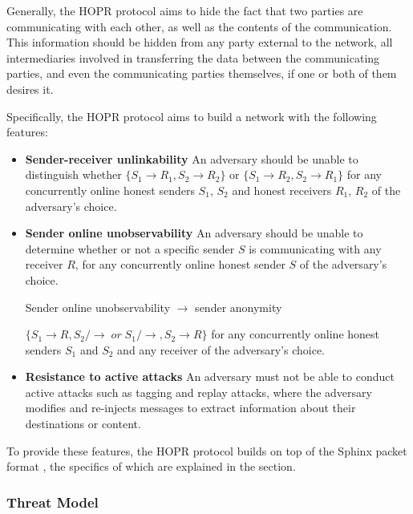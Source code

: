 Generally, the HOPR protocol aims to hide the fact that two parties are communicating with each other, as well as the contents of the communication. This information should be hidden from any party external to the network, all intermediaries involved in transferring the data between the communicating parties, and even the communicating parties themselves, if one or both of them desires it.

Specifically, the HOPR protocol aims to build a network with the following features:

\begin{itemize}

    \item \textbf{Sender-receiver unlinkability} An adversary should be unable
        to distinguish whether $\{S_1\rightarrow R_1, S_2\rightarrow R_2\}$ or
        $\{S_1\rightarrow R_2, S_2\rightarrow R_1\}$ for any concurrently online
        honest senders $S_1$, $S_2$ and honest receivers $R_1$, $R_2$ of the
        adversary’s choice.
      \item \textbf{Sender online unobservability} An adversary should be unable to determine whether or not a specific sender $S$ is communicating with any receiver $R$, for any concurrently online honest sender $S$ of the adversary’s choice.
    \begin{center}
    Sender online unobservability $\rightarrow$ sender anonymity 
    \end{center} 
    $\{S_1 \rightarrow R,S_2 /\rightarrow \;or\; S_1 /\rightarrow,S_2 \rightarrow R\}$ for any concurrently online honest senders $S_1$ and $S_2$ and any receiver of the adversary’s choice. 
        

    \item \textbf{Resistance to active attacks} An adversary must not be able to conduct active attacks
        such as tagging and replay attacks, where the adversary modifies and
        re-injects messages to extract information about their destinations or
        content.

\end{itemize}
To provide these features, the HOPR protocol builds on top of the Sphinx packet format \cite{sphinxpaper}, the specifics of which are explained
in the  section.


\subsubsection{Threat Model}

